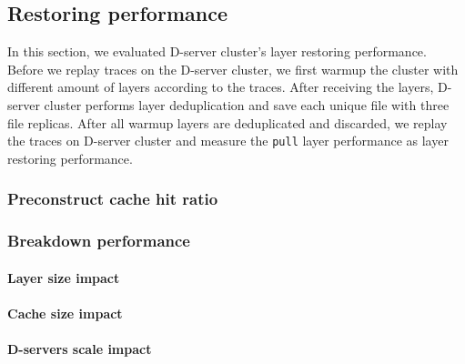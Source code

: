 \subsection{Restoring performance}

In this section, we evaluated D-server cluster's layer restoring performance.
Before we replay traces on the D-server cluster, 
we first warmup the cluster with different amount of layers according to the traces.
After receiving the layers, D-server cluster performs layer deduplication
and save each unique file with three file replicas.
After all warmup layers are deduplicated and discarded,
we replay the traces on D-server cluster 
and measure the \texttt{pull} layer performance as layer restoring performance.

\subsubsection{Preconstruct cache hit ratio}

\subsubsection{Breakdown performance}


\paragraph{Layer size impact}

\paragraph{Cache size impact}

\paragraph{D-servers scale impact}



